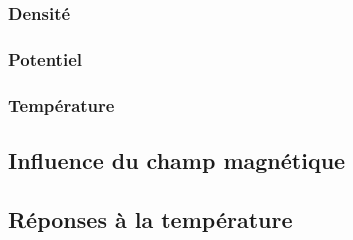 \begin{refsection}
\subsubsection{Densité}
\subsubsection{Potentiel}
\subsubsection{Température}
\subsection{Influence du champ magnétique}
\subsection{Réponses à la température}

%
%
\end{refsection}

